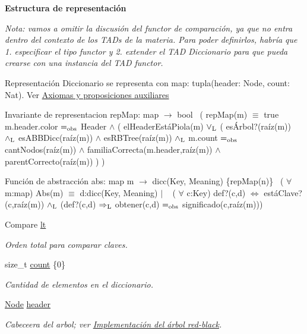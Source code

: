 \begin{Indent}\textbf{ Estructura de representación}\par
{\em Nota\+: vamos a omitir la discusión del functor de comparación, ya que no entra dentro del contexto de los T\+A\+Ds de la materia. Para poder definirlos, habría que 1. especificar el tipo functor y 2. extender el T\+AD Diccionario para que pueda crearse con una instancia del T\+AD functor.

\begin{DoxyParagraph}{Representación}
Diccionario se representa con map\+: tupla(header\+: Node, count\+: Nat). Ver \hyperlink{axiomas}{Axiomas y proposiciones auxiliares}
\end{DoxyParagraph}
\begin{DoxyParagraph}{Invariante de representacion}
rep\+Map\+: map $\to$ bool~\newline
( rep\+Map(m) $\equiv$ true  m.\+header.\+color $=_{\rm obs}$ Header $\land$ ( el\+Header\+Está\+Piola(m) $\lor_{\rm L}$ ( esÁrbol?(raíz(m)) $\land_{\rm L}$ es\+A\+B\+B\+Dicc(raíz(m)) $\land$ es\+R\+B\+Tree(raíz(m)) $\land_{\rm L}$ m.\+count $=_{\rm obs}$ cant\+Nodos(raíz(m)) $\land$ familia\+Correcta(m.\+header,raíz(m)) $\land$ parent\+Correcto(raíz(m)) ) ) 
\end{DoxyParagraph}


\begin{DoxyParagraph}{Función de abstracción}
abs\+: map m $\to$ dicc(Key, Meaning) \{rep\+Map(n)\}~\newline
 ( $\forall$ m\+:map) Abs(m) $\equiv$ d\+:dicc(Key, Meaning) $\vert$ ~\newline
 ( $\forall$ c\+:Key) def?(c,d) $\Leftrightarrow$ está\+Clave?(c,raíz(m)) $\land_{\rm L}$ (def?(c,d) $\Rightarrow_{\rm L}$ obtener(c,d) $=_{\rm obs}$ significado(c,raíz(m))) 
\end{DoxyParagraph}
}\begin{DoxyCompactItemize}
\item 
Compare \hyperlink{classaed2_1_1map_a0e5be36fae0693e4665bd2a615e7550a_a0e5be36fae0693e4665bd2a615e7550a}{lt}
\begin{DoxyCompactList}\small\item\em Orden total para comparar claves. \end{DoxyCompactList}\item 
size\+\_\+t \hyperlink{classaed2_1_1map_a44236c4f16cdc20a10759862b198bde4_a44236c4f16cdc20a10759862b198bde4}{count} \{0\}
\begin{DoxyCompactList}\small\item\em Cantidad de elementos en el diccionario. \end{DoxyCompactList}\item 
\hyperlink{structaed2_1_1map_1_1Node}{Node} \hyperlink{classaed2_1_1map_a92d93f905c8ad73fba18fdc7e8915cce_a92d93f905c8ad73fba18fdc7e8915cce}{header}
\begin{DoxyCompactList}\small\item\em Cabeceera del arbol; ver \hyperlink{Implementacion}{Implementación del árbol red-\/black}. \end{DoxyCompactList}\end{DoxyCompactItemize}
\end{Indent}
